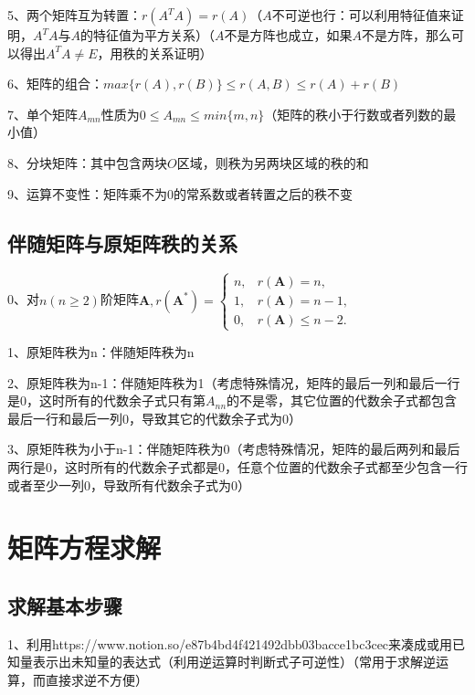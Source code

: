 5、两个矩阵互为转置：$r(A^TA)= r(A)$（$A$不可逆也行：可以利用特征值来证明，$A^TA$与$A$的特征值为平方关系）（$A$不是方阵也成立，如果$A$不是方阵，那么可以得出$A^TA \ne E$，用秩的关系证明）

6、矩阵的组合：$max\{r(A),r(B)\}  \leqslant r(A,B) \leqslant r(A)+r(B)$

7、单个矩阵$A_{mn}$性质为$0 \leqslant A_{mn} \leqslant min\{ m,n \}$（矩阵的秩小于行数或者列数的最小值）

8、分块矩阵：其中包含两块$O$区域，则秩为另两块区域的秩的和

9、运算不变性：矩阵乘不为0的常系数或者转置之后的秩不变



\subsection{伴随矩阵与原矩阵秩的关系}

0、对$n(n \geqslant 2)$阶矩阵$\boldsymbol{A}, r\left(\boldsymbol{A}^{*}\right)= \begin{cases}n, & r(\boldsymbol{A})=n, \\ 1, & r(\boldsymbol{A})=n-1, \\ 0, & r(\boldsymbol{A}) \leqslant n-2 .\end{cases}$

1、原矩阵秩为n：伴随矩阵秩为n

2、原矩阵秩为n-1：伴随矩阵秩为1（考虑特殊情况，矩阵的最后一列和最后一行是0，这时所有的代数余子式只有第$A_{nn}$的不是零，其它位置的代数余子式都包含最后一行和最后一列0，导致其它的代数余子式为0）

3、原矩阵秩为小于n-1：伴随矩阵秩为0（考虑特殊情况，矩阵的最后两列和最后两行是0，这时所有的代数余子式都是0，任意个位置的代数余子式都至少包含一行或者至少一列0，导致所有代数余子式为0）

\section{矩阵方程求解}



\subsection{求解基本步骤}

1、利用https://www.notion.so/e87b4bd4f421492dbb03bacce1bc3cec来凑成或用已知量表示出未知量的表达式（利用逆运算时判断式子可逆性）（常用于求解逆运算，而直接求逆不方便）

